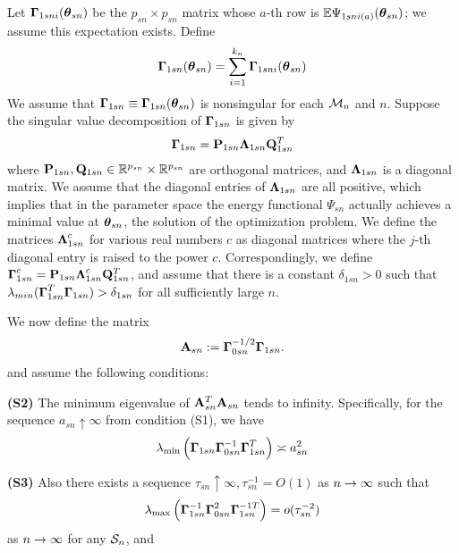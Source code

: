 Let ${\boldsymbol{\Gamma}}_{1 s n i} ({\boldsymbol{\theta}}_{ s n}) $ be the $p_{s n} \times p_{s n}$ 
matrix whose $a$-th row is ${\mathbb{E}} \Psi_{1 s n i (a)} ({\boldsymbol{\theta}}_{s n})$; we assume this 
expectation exists. Define 
\begin{align} 
{\boldsymbol{\Gamma}}_{1 s n} ({\boldsymbol{\theta}}_{ s n})  = \sum_{ i =1}^{ k_{n}}
{\boldsymbol{\Gamma}}_{1 s n i} ({\boldsymbol{\theta}}_{ s n})
\end{align}
We assume that 
${\boldsymbol{\Gamma}}_{1 s n}   \equiv {\boldsymbol{\Gamma}}_{1 s n} ({\boldsymbol{\theta}}_{ s n}) $ is nonsingular  
for each ${\cal{M}}_n$ and $n$. Suppose the singular value decomposition 
of ${\boldsymbol{\Gamma}}_{1 s n}$ is given by 
\begin{align} 
{\boldsymbol{\Gamma}}_{1 s n}  =  {\mathbf{P}}_{1 s n} {\boldsymbol{\Lambda}}_{1 s n} {\mathbf{Q}}^{T}_{1 s n} 
 \end{align}
where ${\mathbf{P}}_{1 s n},  {\mathbf{Q}}_{1 s n}  \in {\mathbb{R}}^{ p_{ s  n}} \times {\mathbb{R}}^{p_{ s  n}}$ 
are orthogonal matrices, and ${\boldsymbol{\Lambda}}_{1 s n}$ is a diagonal  matrix. We assume that the diagonal entries of ${\boldsymbol{\Lambda}}_{1 s n}$ are all positive, which implies that in the parameter space the energy functional $\Psi_{ s n}$ actually achieves a minimal value at ${\boldsymbol{\theta}}_{s n}$, the solution of the optimization problem. We define the matrices ${\boldsymbol{\Lambda}}_{1 s n}^{c}$ for various real numbers $c$ as diagonal matrices 
where the $j$-th diagonal entry is raised to the power $c$. Correspondingly, we 
define ${\boldsymbol{\Gamma}}_{1 s n}^{c} =   {\mathbf{P}}_{1 s n} {\boldsymbol{\Lambda}}_{1 s n}^{c} {\mathbf{Q}}^{T}_{1 s n}$, and assume that there is a constant $\delta_{1 s n} > 0$ such that $\lambda_{{min}} ({\boldsymbol{\Gamma}}_{1 s n}^{T} {\boldsymbol{\Gamma}}_{1 s n}) > \delta_{1 s n}$ for all sufficiently large $n$.

We now define the matrix
%
\begin{align} 
{\mathbf{A}}_{ s n} := 
 {\boldsymbol{\Gamma}}_{0 s n}^{-1/2} {\boldsymbol{\Gamma}}_{1 s n}. 
\end{align}
%
and assume the following conditions: 
%

\vspace{1em}
\noindent\textbf{(S2)}
The minimum eigenvalue of ${\mathbf{A}}^{T}_{s n} {\mathbf{A}}_{s n}$ tends to infinity. Specifically, for the sequence $a_{s n} \uparrow \infty$ from condition (S1), we have
% 
\begin{align} 
\lambda_{{\min}} \left( {\boldsymbol{\Gamma}}_{1 s n} {\boldsymbol{\Gamma}}_{0 s n}^{-1}  {\boldsymbol{\Gamma}}_{1 s n}^{T} \right)
\asymp a_{s n}^{2} 
\end{align}

\noindent\textbf{(S3)} Also there exists a sequence $\tau_{s n} \uparrow \infty, \tau_{s n}^{-1} = O(1)$ as $n \rightarrow \infty$ such that 
\begin{equation}
\lambda_{\max} \left( {\boldsymbol{\Gamma}}_{1 s n}^{-1} {\boldsymbol{\Gamma}}_{0 s n}^{2} {\boldsymbol{\Gamma}}_{1 s n}^{-1T} \right)
= o (\tau_{s n}^{-2})
\label{eq:Trace} 
\end{equation} 
as $n \rightarrow \infty$ for any ${\cal{S}}_n$, and

